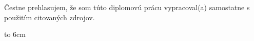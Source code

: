 {~}\vspace{12cm}

\noindent
\begin{minipage}{0.25\textwidth}~\end{minipage}
\begin{minipage}{0.68\textwidth}
Čestne prehlasujem, že som túto diplomovú prácu vypracoval(a) samostatne s použitím citovaných zdrojov.

\bigskip\bigskip

\hfill\hbox to 6cm{\dotfill}
\end{minipage}
\vfill\eject 

